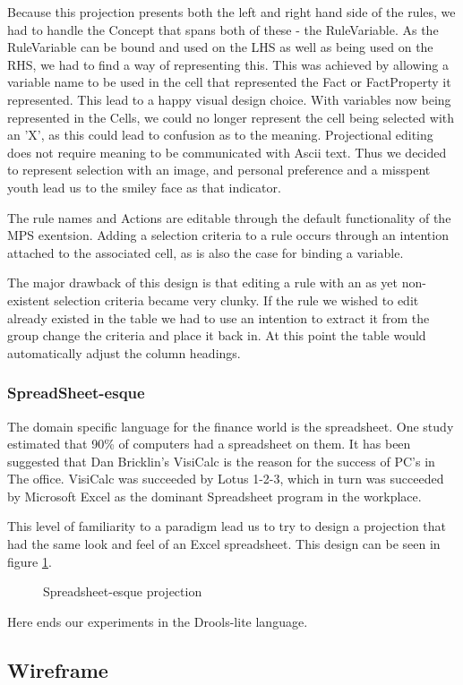 Because this projection presents both the left and right hand side of the rules, we had to handle the Concept that spans both of these - the RuleVariable. 
As the RuleVariable can be bound and used on the LHS as well as being used on the RHS, we had to find a way of representing this.
This was achieved by allowing a variable name to be used in the cell that represented the Fact or FactProperty it represented.
This lead to a happy visual design choice.
With variables now being represented in the Cells, we could no longer represent the cell being selected with an 'X', as this could lead to confusion as to the meaning.
Projectional editing does not require meaning to be communicated with Ascii text. 
Thus we decided to represent selection with an image, and personal preference and a misspent youth lead us to the smiley face as that indicator.

The rule names and Actions are editable through the default functionality of the MPS exentsion.
Adding a selection criteria to a rule occurs through an intention attached to the associated cell, as is also the case for binding a variable.

The major drawback of this design is that editing a rule with an as yet non-existent selection criteria became very clunky.
If the rule we wished to edit already existed in the table we had to use an intention to extract it from the group change the criteria and place it back in.
At this point the table would automatically adjust the column headings.


\subsubsection{SpreadSheet-esque}

The domain specific language for the finance world is the spreadsheet. 
One study estimated that 90\% of computers had a spreadsheet on them\cite{bradley2009using}.
It has been suggested that Dan Bricklin's VisiCalc is the reason for the success of PC's in The office.
VisiCalc was succeeded by Lotus 1-2-3, which in turn was succeeded by Microsoft Excel as the dominant Spreadsheet program in the workplace.

This level of familiarity to a paradigm lead us to try to design a projection that had the same look and feel of an Excel spreadsheet.
This design can be seen in figure \ref{fig:SpreadsheetProjection}.



\begin{figure}[h]
    \centering
    \caption{Spreadsheet-esque projection}
    \label{fig:SpreadsheetProjection}
\end{figure}

Here ends our experiments in the Drools-lite language.

\subsection{Wireframe}
